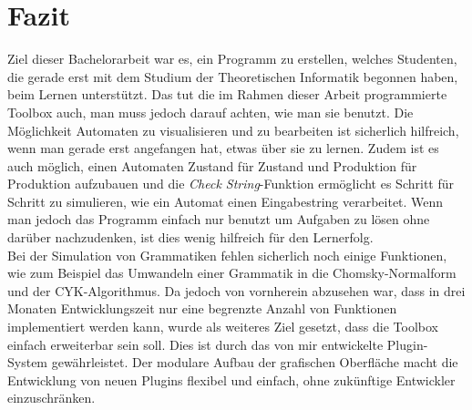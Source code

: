 \section{Fazit}\raggedbottom
Ziel dieser Bachelorarbeit war es, ein Programm zu erstellen, welches Studenten, die gerade erst mit dem Studium der Theoretischen Informatik begonnen haben, beim Lernen unterstützt. Das tut die im Rahmen dieser Arbeit programmierte Toolbox auch, man muss jedoch darauf achten, wie man sie benutzt. Die Möglichkeit Automaten zu visualisieren und zu bearbeiten ist sicherlich hilfreich, wenn man gerade erst angefangen hat, etwas über sie zu lernen. Zudem ist es auch möglich, einen Automaten Zustand für Zustand und Produktion für Produktion aufzubauen und die \textit{Check String}-Funktion ermöglicht es Schritt für Schritt zu simulieren, wie ein Automat einen Eingabestring verarbeitet. Wenn man jedoch das Programm einfach nur benutzt um Aufgaben zu lösen ohne darüber nachzudenken, ist dies wenig hilfreich für den Lernerfolg.\\
Bei der Simulation von Grammatiken fehlen sicherlich noch einige Funktionen, wie zum Beispiel das Umwandeln einer Grammatik in die Chomsky-Normalform und der CYK-Algorithmus. Da jedoch von vornherein abzusehen war, dass in drei Monaten Entwicklungszeit nur eine begrenzte Anzahl von Funktionen implementiert werden kann, wurde als weiteres Ziel gesetzt, dass die Toolbox einfach erweiterbar sein soll. Dies ist durch das von mir entwickelte Plugin-System gewährleistet. Der modulare Aufbau der grafischen Oberfläche macht die Entwicklung von neuen Plugins flexibel und einfach, ohne zukünftige Entwickler einzuschränken.